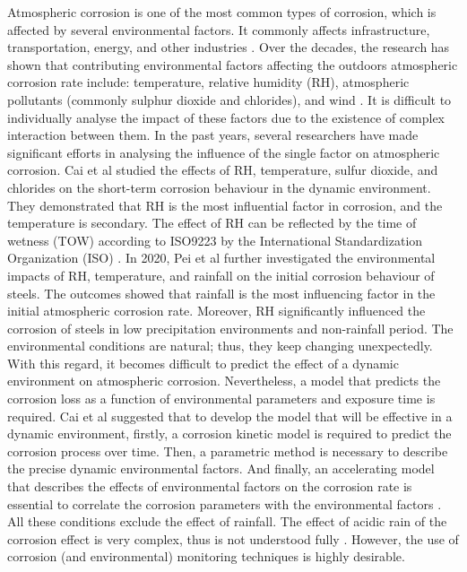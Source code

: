 \documentclass[12pt]{report}
\begin{document}
Atmospheric corrosion is one of the most common types of corrosion, which is affected by several environmental factors. It commonly affects infrastructure, transportation, energy, and other industries \cite{pei2021understanding}. Over the decades, the research has shown that contributing environmental factors affecting the outdoors atmospheric corrosion rate include: temperature, relative humidity (RH), atmospheric pollutants (commonly sulphur dioxide and chlorides), and wind \cite{abou2001mechanical, islam2018effects}. It is difficult to individually analyse the impact of these factors due to the existence of complex interaction between them.
In the past years, several researchers have made significant efforts in analysing the influence of the single factor on atmospheric corrosion. Cai et al \cite{cai2018influence} studied the effects of RH, temperature, sulfur dioxide, and chlorides on the short-term corrosion behaviour in the dynamic environment. They demonstrated that RH is the most influential factor in corrosion, and the temperature is secondary. The effect of RH can be reflected by the time of wetness (TOW) according to ISO9223 by the International Standardization Organization (ISO) \cite{cengel1998heat, islam2018effects}. In 2020, Pei et al \cite{pei2021understanding} further investigated the environmental impacts of RH, temperature, and rainfall on the initial corrosion behaviour of steels. The outcomes showed that rainfall is the most influencing factor in the initial atmospheric corrosion rate.  Moreover, RH significantly influenced the corrosion of steels in low precipitation environments and non-rainfall period.
The environmental conditions are natural; thus, they keep changing unexpectedly. With this regard, it becomes difficult to predict the effect of a dynamic environment on atmospheric corrosion. Nevertheless, a model that predicts the corrosion loss as a function of environmental parameters and exposure time is required. Cai et al \cite{cai2018influence} suggested that to develop the model that will be effective in a dynamic environment, firstly, a corrosion kinetic model is required to predict the corrosion process over time. Then, a parametric method is necessary to describe the precise dynamic environmental factors. And finally, an accelerating model that describes the effects of environmental factors on the corrosion rate is essential to correlate the corrosion parameters with the environmental factors \cite{loto2019performance}. All these conditions exclude the effect of rainfall. The effect of acidic rain of the corrosion effect is very complex, thus is not understood fully \cite{pei2021understanding}. However, the use of corrosion (and environmental) monitoring techniques is highly desirable.
\end{document}
